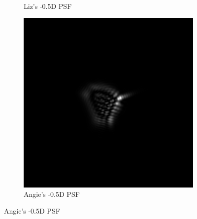 \documentclass{article}
\begin{document}
\begin{figure}[H]
\begin{subfigure}{.3\textwidth}
  \caption{Liz's -0.5D PSF}
  \label{fig:lizn05dpsf}
\end{subfigure}
\begin{subfigure}{.3\textwidth}
  \centering
  \includegraphics[width=1\linewidth]{Angie_R_0526_1_500_zer_-05_5_PSF.png}
  \caption{Angie's -0.5D PSF}
  \label{fig:angien05dpsf}
\end{subfigure}

\medskip


\end{figure}
\end{document}
